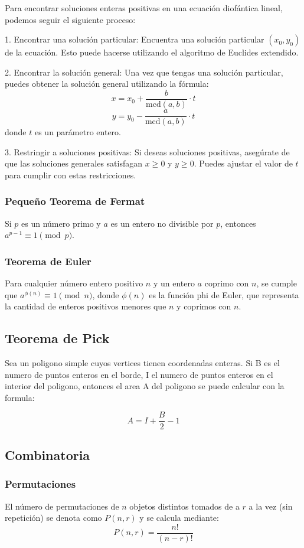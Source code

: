Para encontrar soluciones enteras positivas en una ecuación diofántica lineal, podemos seguir el siguiente proceso:

1. Encontrar una solución particular: Encuentra una solución particular $(x_0, y_0)$ de la ecuación. Esto puede hacerse utilizando el algoritmo de Euclides extendido.

2. Encontrar la solución general: Una vez que tengas una solución particular, puedes obtener la solución general utilizando la fórmula:
\[ x = x_0 + \frac{b}{\text{mcd}(a, b)} \cdot t \]
\[ y = y_0 - \frac{a}{\text{mcd}(a, b)} \cdot t \]
donde $t$ es un parámetro entero.

3. Restringir a soluciones positivas: Si deseas soluciones positivas, asegúrate de que las soluciones generales satisfagan $x \geq 0$ y $y \geq 0$. Puedes ajustar el valor de $t$ para cumplir con estas restricciones.

\subsubsection{Pequeño Teorema de Fermat}
Si $p$ es un número primo y $a$ es un entero no divisible por $p$, entonces $a^{p-1} \equiv 1 \pmod{p}$.

\subsubsection{Teorema de Euler}
Para cualquier número entero positivo $n$ y un entero $a$ coprimo con $n$, se cumple que $a^{\phi(n)} \equiv 1 \pmod{n}$, donde $\phi(n)$ es la función phi de Euler, que representa la cantidad de enteros positivos menores que $n$ y coprimos con $n$.

\subsection{Teorema de Pick}

Sea un poligono simple cuyos vertices tienen coordenadas enteras. Si B es el numero de puntos enteros en el borde, I el numero de puntos enteros en el interior del poligono, entonces el area A del poligono se puede calcular con la formula:

\[ A = I + \frac{B}{2} - 1 \]

\subsection{Combinatoria}
\subsubsection{Permutaciones}
El número de permutaciones de $n$ objetos distintos tomados de a $r$ a la vez (sin repetición) se denota como $P(n, r)$ y se calcula mediante:
\[ P(n, r) = \frac{n!}{(n - r)!} \]

